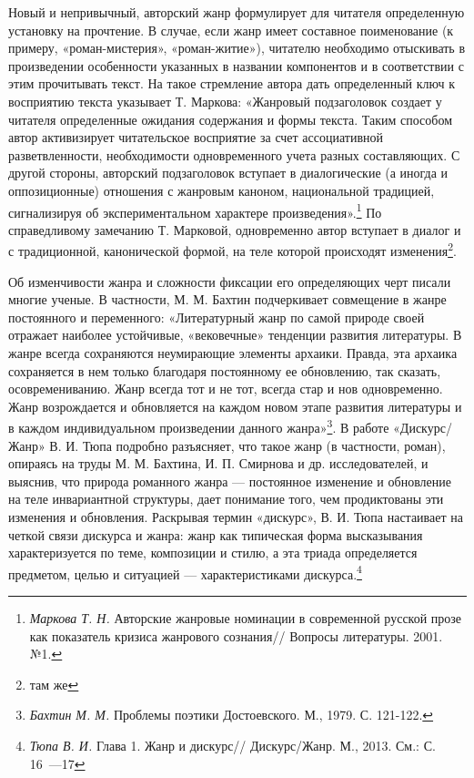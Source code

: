 \documentclass{kursa4}
\begin{document}
    Новый и непривычный, авторский жанр формулирует для читателя определенную установку на прочтение. В случае, если жанр имеет составное поименование (к примеру, «роман-мистерия», «роман-житие»), читателю необходимо отыскивать в произведении особенности указанных в названии компонентов и в соответствии с этим прочитывать текст. На такое стремление автора дать определенный ключ к восприятию текста указывает Т. Маркова:\newline
    «Жанровый подзаголовок создает у читателя определенные ожидания содержания и формы текста. Таким способом автор активизирует читательское восприятие за счет ассоциативной разветвленности, необходимости одновременного учета разных составляющих. С другой стороны, авторский подзаголовок вступает в диалогические (а иногда и оппозиционные) отношения с жанровым каноном, национальной традицией, сигнализируя об экспериментальном характере произведения».\footnote{{ }\textit{Маркова Т. Н.} Авторские жанровые номинации в современной русской прозе как показатель кризиса жанрового сознания// Вопросы литературы. 2001. №1.} По справедливому замечанию Т. Марковой, одновременно автор вступает в диалог и с традиционной, канонической формой, на теле которой происходят изменения\footnote{там же}. 

    Об изменчивости жанра и сложности фиксации его определяющих черт писали многие ученые. В частности, М. М. Бахтин подчеркивает совмещение в жанре постоянного и переменного: «Литературный жанр по самой природе своей отражает наиболее устойчивые, «вековечные» тенденции развития литературы. В жанре всегда сохраняются неумирающие элементы архаики. Правда, эта архаика сохраняется в нем только благодаря постоянному ее обновлению, так сказать, осовремениванию. Жанр всегда тот и не тот, всегда стар и нов одновременно. Жанр возрождается и обновляется на каждом новом этапе развития литературы и в каждом индивидуальном произведении данного жанра»\footnote{\textit{Бахтин М. М.} Проблемы поэтики Достоевского. М., 1979. С. 121-122.}.  
    В работе «Дискурс/Жанр» В. И. Тюпа подробно разъясняет, что такое жанр (в частности, роман), опираясь на труды М. М. Бахтина, И. П. Смирнова и др. исследователей, и выяснив, что природа романного жанра — постоянное изменение и обновление на теле инвариантной структуры, дает понимание того, чем продиктованы эти изменения и обновления. Раскрывая термин «дискурс», В. И. Тюпа настаивает на четкой связи дискурса и жанра: жанр как типическая форма высказывания характеризуется по теме, композиции и стилю, а эта триада определяется предметом, целью и ситуацией — характеристиками дискурса.\footnote{\textit{Тюпа В. И.} Глава 1. Жанр и дискурс// Дискурс/Жанр. М., 2013. См.: С. 16~---17} 
\end{document}
